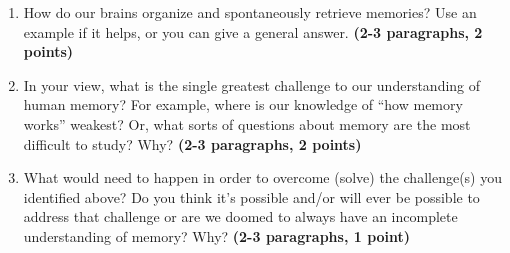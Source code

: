 \documentclass[11pt]{article}
\begin{document}
\begin{enumerate}
\item How do our brains organize and spontaneously retrieve memories?
  Use an example if it helps, or you can give a general answer.
  \textbf{(2-3 paragraphs, 2 points)}

\item In your view, what is the single greatest challenge to our understanding
  of human memory?  For example, where is our knowledge of ``how
  memory works'' weakest?  Or, what sorts of questions about memory are
  the most difficult to study?  Why?  \textbf{(2-3 paragraphs, 2 points)}

\item What would need to happen in order to overcome (solve) the challenge(s) you
  identified above?  Do you think it's possible and/or will ever be
  possible to address that challenge or are we doomed to always have
  an incomplete understanding of memory?  Why?  \textbf{(2-3 paragraphs, 1 point)}
\end{enumerate}
\end{document}
